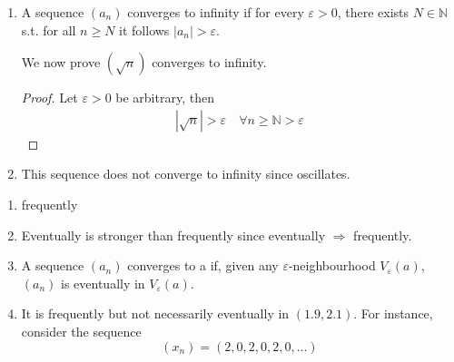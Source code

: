 \begin{enumerate}[label=(\alph*)]
    \item 
    \begin{definition}
        A sequence $(a_n)$ converges to infinity if for every 
        $\varepsilon > 0$, there exists $N \in \mathbb{N}$ s.t. 
        for all $n \geq N$ it follows $|a_n| > \varepsilon$.
    \end{definition}

    We now prove $(\sqrt n)$ converges to infinity.
    \begin{proof}
        Let $\varepsilon > 0$ be arbitrary, then
        \begin{align*}
            |\sqrt n | > \varepsilon \quad \forall n \geq \mathbb{N} > \varepsilon
        \end{align*}
    \end{proof}

    \item 
    This sequence does not converge to infinity since oscillates.
\end{enumerate}

\begin{enumerate}[label=(\alph*)]
    \item frequently
    \item Eventually is stronger than frequently since eventually 
    $\Rightarrow $ frequently.

    \item
    \begin{definition}
        A sequence $(a_n)$ converges to a if, given any $\varepsilon$-neighbourhood
         $V_\varepsilon(a)$, $(a_n)$ is eventually in $V_\varepsilon(a)$.
    \end{definition}

    \item 
    It is frequently but not necessarily eventually in $(1.9, 2.1)$.
    For instance, consider the sequence
    \begin{equation*}
        (x_n) = (2,0,2,0,2,0,...)
    \end{equation*}
\end{enumerate}


